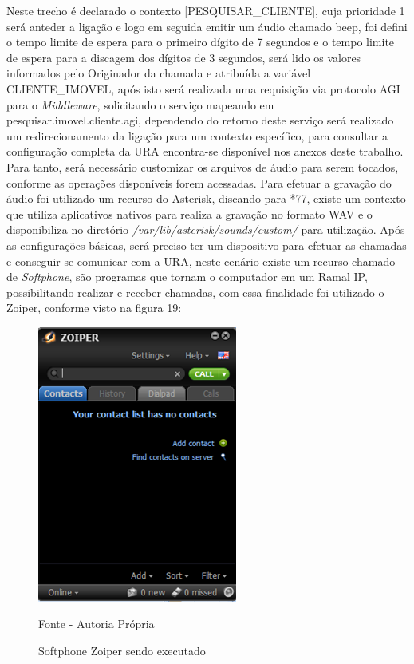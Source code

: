 Neste trecho é declarado o contexto [PESQUISAR\_CLIENTE], cuja prioridade 1 será anteder a ligação e logo em seguida emitir um áudio chamado beep, foi defini o tempo limite de espera para o primeiro dígito de 7 segundos e o tempo limite de espera para a discagem dos dígitos de 3 segundos, será lido os valores informados pelo Originador da chamada e atribuída a variável CLIENTE\_IMOVEL, após isto será realizada uma requisição via protocolo AGI para o \textit{Middleware}, solicitando o serviço mapeando em pesquisar.imovel.cliente.agi, dependendo do retorno deste serviço será realizado um redirecionamento da ligação para um contexto específico, para consultar a configuração completa da URA encontra-se disponível nos anexos deste trabalho.
Para tanto, será necessário customizar os arquivos de áudio para serem tocados, conforme as operações disponíveis forem acessadas. Para efetuar a gravação do áudio foi utilizado um recurso do Asterisk, discando para *77, existe um contexto que utiliza aplicativos nativos para realiza a gravação no formato WAV e o disponibiliza no diretório \textit{/var/lib/asterisk/sounds/custom/} para utilização.
Após as configurações básicas, será preciso ter um dispositivo para efetuar as chamadas e conseguir se comunicar com a URA, neste cenário existe um recurso chamado de \textit{Softphone}, são programas que tornam o computador em um Ramal IP, possibilitando realizar e receber chamadas, com essa finalidade foi utilizado o Zoiper, conforme visto na figura 19:

\begin{figure}[!htb]
	\centering
	\includegraphics{figuras/zoiper.png}
	\caption{Softphone Zoiper sendo executado}	
	Fonte - Autoria Própria
\end{figure}


